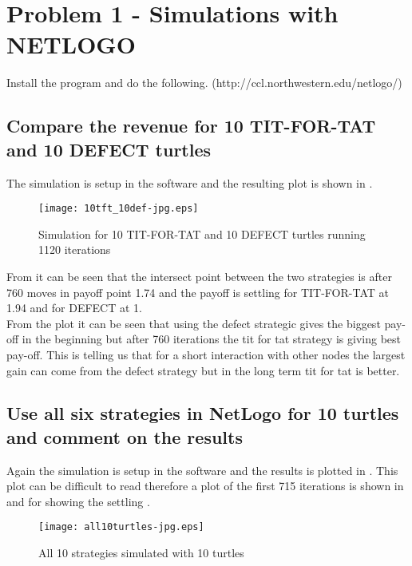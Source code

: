 \section{Problem 1 - Simulations with NETLOGO}
Install the program and do the following. (http://ccl.northwestern.edu/netlogo/)
\subsection{Compare the revenue for 10 TIT-FOR-TAT and 10 DEFECT turtles}

The simulation is setup in the software and the resulting plot is shown in .
\begin{figure}[!h]
  \centering
  \texttt{[image: 10tft\_10def-jpg.eps]}
  \caption{Simulation for 10 TIT-FOR-TAT and 10 DEFECT turtles running 1120 iterations}
  \label{fig:10tft_10def-jpg}
\end{figure}

From  it can be seen that the intersect point between the two strategies is after 760 moves in payoff point 1.74 and the payoff is settling for TIT-FOR-TAT at 1.94 and for DEFECT at 1.\\

From the plot it can be seen that using the defect strategic gives the biggest pay-off in the beginning but after 760 iterations the tit for tat strategy is giving best pay-off. This is telling us that for a short interaction with other nodes the largest gain can come from the defect strategy but in the long term tit for tat is better.   

\subsection{Use all six strategies in NetLogo for 10 turtles and comment on the results}

Again the simulation is setup in the software and the results is plotted in . This plot can be difficult to read therefore a plot of the first 715 iterations is shown in  and for showing the settling . 

\begin{figure}[!h]
  \centering
  \texttt{[image: all10turtles-jpg.eps]}
  \caption{All 10 strategies simulated with 10 turtles}
  \label{fig:all10turtles-jpg}
\end{figure}



